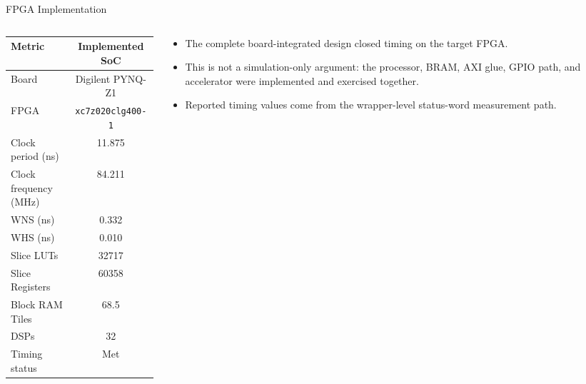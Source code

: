 \documentclass[aspectratio=169]{beamer}
\begin{document}
\begin{frame}{FPGA Implementation}
\begin{columns}[T,totalwidth=\textwidth]
\begin{column}{0.50\textwidth}
\centering
\scriptsize
\begin{tabular}{lc}
\toprule
Metric & Implemented SoC \\
\midrule
Board & Digilent PYNQ-Z1 \\
FPGA & \texttt{xc7z020clg400-1} \\
Clock period (ns) & 11.875 \\
Clock frequency (MHz) & 84.211 \\
WNS (ns) & 0.332 \\
WHS (ns) & 0.010 \\
Slice LUTs & 32717 \\
Slice Registers & 60358 \\
Block RAM Tiles & 68.5 \\
DSPs & 32 \\
Timing status & Met \\
\bottomrule
\end{tabular}
\end{column}
\begin{column}{0.46\textwidth}
\small
\begin{itemize}
\item The complete board-integrated design closed timing on the target FPGA.
\item This is not a simulation-only argument: the processor, BRAM, AXI glue, GPIO path, and accelerator were implemented and exercised together.
\item Reported timing values come from the wrapper-level status-word measurement path.
\end{itemize}
\end{column}
\end{columns}
\end{frame}
\end{document}
